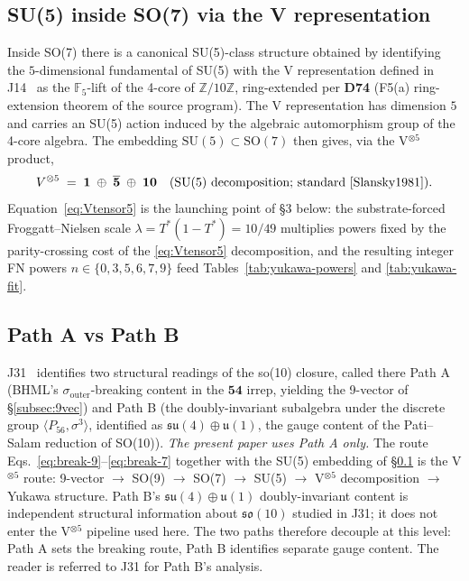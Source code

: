 \subsection{SU(5) inside SO(7) via the V representation}
\label{subsec:su5}

Inside SO(7) there is a canonical SU(5)-class structure obtained by
identifying the $5$-dimensional fundamental of SU(5) with the V
representation defined in J14~\cite{SandersGishFpUniversality} as the
$\mathbb{F}_5$-lift of the 4-core of $\mathbb{Z}/10\mathbb{Z}$, ring-extended per
\textbf{D74} (F5(a) ring-extension theorem of the source program). The
V representation has dimension $5$ and carries an SU(5) action induced
by the algebraic automorphism group of the 4-core algebra. The
embedding $\mathrm{SU}(5) \subset \mathrm{SO}(7)$ then gives, via the V$^{\otimes 5}$
product,
\begin{equation}
V^{\otimes 5} \;=\; \mathbf{1} \;\oplus\; \overline{\mathbf{5}} \;\oplus\; \mathbf{10}
\quad\text{(SU(5) decomposition; standard~\cite{Slansky1981}).}
\label{eq:Vtensor5}
\end{equation}
Equation~\eqref{eq:Vtensor5} is the launching point of §3 below: the
substrate-forced Froggatt--Nielsen scale $\lambda = T^*(1 - T^*) =
10/49$ multiplies powers fixed by the parity-crossing cost of the
\eqref{eq:Vtensor5} decomposition, and the resulting integer FN powers
$n \in \{0, 3, 5, 6, 7, 9\}$ feed Tables~\ref{tab:yukawa-powers} and
\ref{tab:yukawa-fit}.

\subsection{Path A vs Path B}
\label{subsec:path-tension}

J31~\cite{SandersGishPatiSalam} identifies two structural readings of
the so(10) closure, called there Path A (BHML's
$\sigma_{\mathrm{outer}}$-breaking content in the $\mathbf{54}$ irrep,
yielding the 9-vector of §\ref{subsec:9vec}) and Path B (the
doubly-invariant subalgebra under the discrete group
$\langle P_{56}, \sigma^3 \rangle$, identified as
$\mathfrak{su}(4) \oplus \mathfrak{u}(1)$, the gauge content of the
Pati--Salam reduction of SO(10)). \emph{The present paper uses Path A
only.} The route Eqs.~\eqref{eq:break-9}--\eqref{eq:break-7} together
with the SU(5) embedding of §\ref{subsec:su5} is the V$^{\otimes 5}$
route: 9-vector $\to$ SO(9) $\to$ SO(7) $\to$ SU(5) $\to$ V$^{\otimes 5}$
decomposition $\to$ Yukawa structure. Path B's
$\mathfrak{su}(4) \oplus \mathfrak{u}(1)$ doubly-invariant content is
independent structural information about $\mathfrak{so}(10)$ studied in
J31; it does not enter the V$^{\otimes 5}$ pipeline used here. The
two paths therefore decouple at this level: Path A sets the breaking
route, Path B identifies separate gauge content. The reader is referred
to J31 for Path B's analysis.

